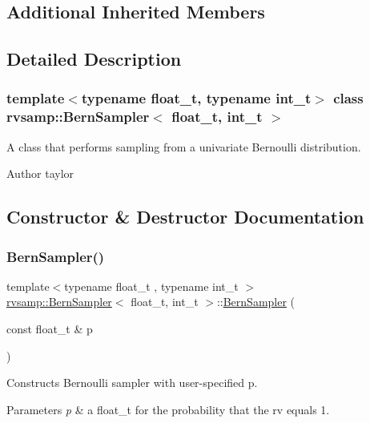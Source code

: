 \subsection*{Additional Inherited Members}


\subsection{Detailed Description}
\subsubsection*{template$<$typename float\+\_\+t, typename int\+\_\+t$>$\newline
class rvsamp\+::\+Bern\+Sampler$<$ float\+\_\+t, int\+\_\+t $>$}

A class that performs sampling from a univariate Bernoulli distribution. 

\begin{DoxyAuthor}{Author}
taylor 
\end{DoxyAuthor}


\subsection{Constructor \& Destructor Documentation}
\mbox{\label{classrvsamp_1_1BernSampler_a18658e918b5bcd5cefdd900ded068686}} 
\subsubsection{\texorpdfstring{Bern\+Sampler()}{BernSampler()}}
{\footnotesize\ttfamily template$<$typename float\+\_\+t , typename int\+\_\+t $>$ \\
\hyperlink{classrvsamp_1_1BernSampler}{rvsamp\+::\+Bern\+Sampler}$<$ float\+\_\+t, int\+\_\+t $>$\+::\hyperlink{classrvsamp_1_1BernSampler}{Bern\+Sampler} (\begin{DoxyParamCaption}\item[{const float\+\_\+t \&}]{p }\end{DoxyParamCaption})}



Constructs Bernoulli sampler with user-\/specified p. 


\begin{DoxyParams}{Parameters}
{\em p} & a float\+\_\+t for the probability that the rv equals 1. \\
\hline
\end{DoxyParams}


